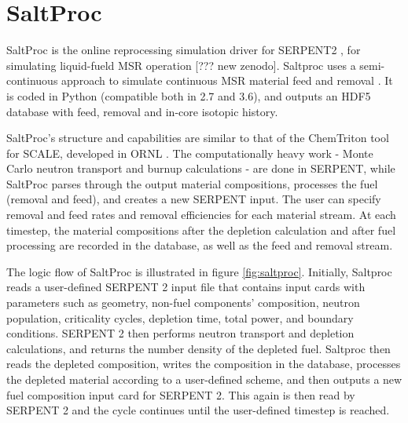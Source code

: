 \section{SaltProc}

SaltProc is the online reprocessing simulation
driver for SERPENT2 \cite{leppanen_serpent_2015},
for simulating liquid-fueld \gls{MSR} operation [??? new zenodo].
Saltproc uses a semi-continuous approach to simulate
continuous \gls{MSR} material feed and removal \cite{rykhlevskii_online_2017}.
It is coded in Python (compatible both in 2.7 and 3.6), and
outputs an HDF5 \cite{the_hdf_group_hierarchical_1997} database
with feed, removal and in-core isotopic history.

SaltProc's structure and capabilities are similar to that of the
ChemTriton tool for SCALE, developed in ORNL \cite{betzler_molten_2017}.
The computationally heavy work - Monte Carlo neutron transport and
burnup calculations - are done in SERPENT, while SaltProc parses through
the output material compositions, processes the fuel (removal and feed),
and creates a new SERPENT input. The user can specify removal and feed
rates and removal efficiencies for each material stream. At each
timestep, the material compositions after the
depletion calculation and after fuel processing are recorded in the
database, as well as the feed and removal stream. 

The logic flow of SaltProc is illustrated in figure \ref{fig:saltproc}.
Initially, Saltproc reads a user-defined SERPENT 2 input file that
contains input cards with parameters such as  geometry, non-fuel components' composition,
neutron population, criticality cycles, depletion time, total power, and boundary conditions.
SERPENT 2 then performs neutron transport and depletion calculations, and 
returns the number density of the depleted fuel. Saltproc then reads the
depleted composition, writes the composition in the database, processes
the depleted material according to a user-defined scheme, and then
outputs a new fuel composition input card for SERPENT 2. This again
is then read by SERPENT 2 and the cycle continues until the user-defined
timestep is reached.

